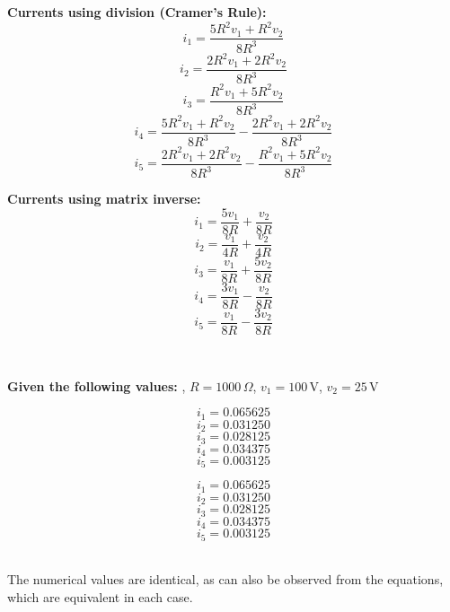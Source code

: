\documentclass[a4paper, 12pt]{report}
\begin{document}
\begin{minipage}{0.5\textwidth}\centering
    \textbf{Currents using division (Cramer's Rule):}
    \[i_1 = \frac{5R^2v_1 + R^2v_2}{8R^3}\]
    \[i_2 = \frac{2R^2v_1 + 2R^2v_2}{8R^3}\]
    \[i_3 = \frac{R^2v_1 + 5R^2v_2}{8R^3}\]
    \[i_4 = \frac{5R^2v_1 + R^2v_2}{8R^3} - \frac{2R^2v_1 + 2R^2v_2}{8R^3}\]
    \[i_5 = \frac{2R^2v_1 + 2R^2v_2}{8R^3} - \frac{R^2v_1 + 5R^2v_2}{8R^3}\]
\end{minipage}\hfill%
\begin{minipage}{0.45\textwidth}\centering
    \textbf{Currents using matrix inverse:}
    \[i_1 = \frac{5v_1}{8R} + \frac{v_2}{8R}\]
    \[i_2 = \frac{v_1}{4R} + \frac{v_2}{4R}\]
    \[i_3 = \frac{v_1}{8R} + \frac{5v_2}{8R}\]
    \[i_4 = \frac{3v_1}{8R} - \frac{v_2}{8R}\]
    \[i_5 = \frac{v_1}{8R} - \frac{3v_2}{8R}\]
\end{minipage}\\[1em]
\begin{center}
\textbf{Given the following values:} , $R = 1000 \, \Omega$, $v_1 = 100 \, \text{V}$, $v_2 = 25 \, \text{V}$
\end{center}
\vspace{-1em}
\begin{minipage}{0.45\textwidth}\centering
    \[i_1 = 0.065625\]
    \[i_2 = 0.031250\]
    \[i_3 = 0.028125\]
    \[i_4 = 0.034375\]
    \[i_5 = 0.003125\]
\end{minipage}\hfill%
\begin{minipage}{0.45\textwidth}
    \[i_1 = 0.065625\]
    \[i_2 = 0.031250\]
    \[i_3 = 0.028125\]
    \[i_4 = 0.034375\]
    \[i_5 = 0.003125\]
\end{minipage}\\[1em]

The numerical values are identical, as can also be observed from the equations, which are equivalent in each case.
\end{document}
